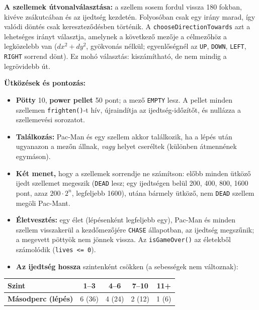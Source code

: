 \documentclass[11pt, a4paper]{article}
\begin{document}
\textbf{A szellemek útvonalválasztása:} a szellem sosem fordul vissza 180 fokban, kivéve zsákutcában és az ijedtség kezdetén. Folyosóban csak egy irány marad, így valódi döntés csak kereszteződésben történik. A \texttt{chooseDirectionTowards} azt a lehetséges irányt választja, amelynek a következő mezője a célmezőhöz a legközelebb van ($dx^2 + dy^2$, gyökvonás nélkül; egyenlőségnél az \texttt{UP}, \texttt{DOWN}, \texttt{LEFT}, \texttt{RIGHT} sorrend dönt). Ez mohó választás: kiszámítható, de nem mindig a legrövidebb út.

\textbf{Ütközések és pontozás:}
\begin{itemize}[itemsep=2pt]
    \item \textbf{Pötty} 10, \textbf{power pellet} 50 pont; a mező \texttt{EMPTY} lesz. A pellet minden szellemen \texttt{frighten()}-t hív, újraindítja az ijedtség-időzítőt, és nullázza a szellemevési sorozatot.
    \item \textbf{Találkozás:} Pac-Man és egy szellem akkor találkozik, ha a lépés után ugyanazon a mezőn állnak, \textit{vagy} helyet cseréltek (különben átmennének egymáson).
    \item \textbf{Két menet,} hogy a szellemek sorrendje ne számítson: előbb minden ütköző ijedt szellemet megeszik (\texttt{DEAD} lesz; egy ijedtségen belül 200, 400, 800, 1600 pont, azaz $200 \cdot 2^n$, legfeljebb 1600), utána bármely ütköző, nem \texttt{DEAD} szellem megöli Pac-Mant.
    \item \textbf{Életvesztés:} egy élet (lépésenként legfeljebb egy), Pac-Man és minden szellem visszakerül a kezdőmezőjére \texttt{CHASE} állapotban, az ijedtség megszűnik; a megevett pöttyök nem jönnek vissza. Az \texttt{isGameOver()} az életekből számolódik (\texttt{lives <= 0}).
    \item \textbf{Az ijedtség hossza} szintenként csökken (a sebességek nem változnak):
\end{itemize}
\begin{center}
\begin{tabular}{@{}lcccc@{}}
    \toprule
    \textbf{Szint} & 1--3 & 4--6 & 7--10 & 11+ \\
    \midrule
    \textbf{Másodperc (lépés)} & 6 (36) & 4 (24) & 2 (12) & 1 (6) \\
    \bottomrule
\end{tabular}
\end{center}

\end{document}
